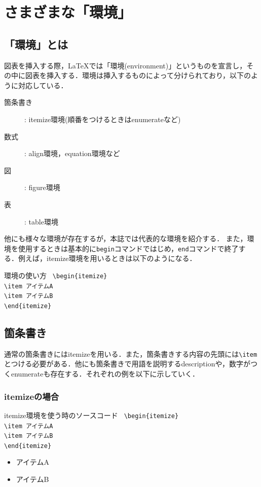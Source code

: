 \section{さまざまな「環境」}
\subsection{「環境」とは}
図表を挿入する際，\LaTeX では「環境(environment)」というものを宣言し，その中に図表を挿入する．環境は挿入するものによって分けられており，以下のように対応している．
\begin{description}
  \item[箇条書き]: itemize環境(順番をつけるときはenumerateなど)
  \item[数式]: align環境，equation環境など
  \item[図]: figure環境
  \item[表]: table環境
\end{description}
他にも様々な環境が存在するが，本誌では代表的な環境を紹介する．
また，環境を使用するときは基本的に\texttt{begin}コマンドではじめ，\texttt{end}コマンドで終了する．例えば，itemize環境を用いるときは以下のようになる．
\begin{itembox}[c]{環境の使い方}
  \texttt{
    \hspace{-0.5\zw}\textbackslash begin\{itemize\}\\
    \hspace{2\zw}\textbackslash item アイテムA\\
    \hspace{2\zw}\textbackslash item アイテムB\\
    \textbackslash end\{itemize\}
  }
\end{itembox}
\subsection{箇条書き}
通常の箇条書きにはitemizeを用いる．また，箇条書きする内容の先頭には\texttt{\textbackslash item}とつける必要がある．他にも箇条書きで用語を説明するdescriptionや，数字がつくenumerateも存在する．それぞれの例を以下に示していく．
\newpage
\subsubsection{itemizeの場合}
\begin{itembox}[c]{itemize環境を使う時のソースコード}
  \texttt{
    \hspace{-0.5\zw}\textbackslash begin\{itemize\}\\
    \hspace{2\zw}\textbackslash item アイテムA\\
    \hspace{2\zw}\textbackslash item アイテムB\\
    \textbackslash end\{itemize\}
  }
\end{itembox}
\begin{itemize}
  \item アイテムA
  \item アイテムB
\end{itemize}

